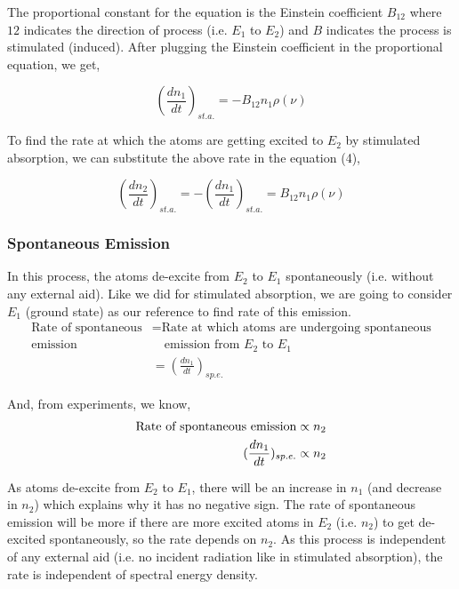 \documentclass[12pt]{article}
\begin{document}
The proportional constant for the equation is the Einstein coefficient $B_{12}$ where $12$ indicates the direction of process (i.e. $E_{1}$ to $E_{2}$) and $B$ indicates the process is stimulated (induced). After plugging the Einstein coefficient in the proportional equation, we get,

\begin{equation}
    (\frac{dn_{1}}{dt})_{st.a.} = -B_{12}n_{1}\rho(\nu) 
\end{equation}

To find the rate at which the atoms are getting excited to $E_{2}$ by stimulated absorption, we can substitute the above rate in the equation (4),

\begin{equation*}
    (\frac{dn_{2}}{dt})_{st.a.} = -(\frac{dn_{1}}{dt})_{st.a.} = B_{12}n_{1}\rho(\nu)
\end{equation*}

\subsubsection{Spontaneous Emission}

In this process, the atoms de-excite from $E_{2}$ to $E_{1}$ spontaneously (i.e. without any external aid). Like we did for stimulated absorption, we are going to consider $E_{1}$ (ground state) as our reference to find rate of this emission.
\begin{align*}
    \text{Rate of spontaneous} & = \text{Rate at which atoms are undergoing spontaneous} \\
    \text{emission} & \quad \text{emission from } E_{2} \text{ to } E_{1} \\ 
    & = (\frac{dn_{1}}{dt})_{sp.e.}
\end{align*}

And, from experiments, we know, 
\begin{align*}
    \textnormal{Rate of spontaneous emission} \propto n_{2} \\ 
    (\frac{dn_{1}}{dt})_{sp.e.} \propto n_{2}
\end{align*}

As atoms de-excite from $E_{2}$ to $E_{1}$, there will be an increase in $n_{1}$ (and decrease in $n_{2}$) which explains why it has no negative sign. The rate of spontaneous emission will be more if there are more excited atoms in $E_{2}$ (i.e. $n_{2}$) to get de-excited spontaneously, so the rate depends on $n_{2}$. As this process is independent of any external aid (i.e. no incident radiation like in stimulated absorption), the rate is independent of spectral energy density. \vspace{.2cm}
\end{document}
